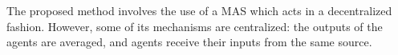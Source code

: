﻿\documentclass{ieeeaccess}
\begin{document}



The proposed method involves the use of a MAS which acts in a
decentralized fashion. However, some of its mechanisms are
centralized: the outputs of the agents are averaged, and agents
receive their inputs from the same source.

\end{document}
